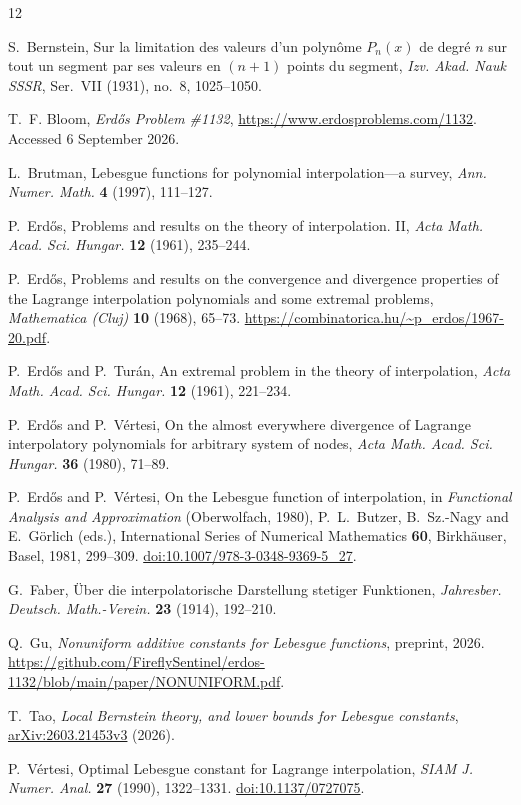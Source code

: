 \documentclass[11pt]{article}
\theoremstyle{remark}
\numberwithin{equation}{section}
\begin{document}
\begin{thebibliography}{12}

S.~Bernstein,
Sur la limitation des valeurs d'un polyn\^ome \(P_n(x)\) de degr\'e \(n\)
sur tout un segment par ses valeurs en \((n+1)\) points du segment,
\emph{Izv. Akad. Nauk SSSR}, Ser.~VII (1931), no.~8, 1025--1050.

T.~F. Bloom,
\emph{Erd\H{o}s Problem \#1132},
\url{https://www.erdosproblems.com/1132}.
Accessed 6 September 2026.

L.~Brutman,
Lebesgue functions for polynomial interpolation---a survey,
\emph{Ann. Numer. Math.} \textbf{4} (1997), 111--127.

P.~Erd\H{o}s,
Problems and results on the theory of interpolation. II,
\emph{Acta Math. Acad. Sci. Hungar.} \textbf{12} (1961), 235--244.

P.~Erd\H{o}s,
Problems and results on the convergence and divergence properties of
the Lagrange interpolation polynomials and some extremal problems,
\emph{Mathematica (Cluj)} \textbf{10} (1968), 65--73.
\url{https://combinatorica.hu/~p_erdos/1967-20.pdf}.

P.~Erd\H{o}s and P.~Tur\'an,
An extremal problem in the theory of interpolation,
\emph{Acta Math. Acad. Sci. Hungar.} \textbf{12} (1961), 221--234.

P.~Erd\H{o}s and P.~V\'ertesi,
On the almost everywhere divergence of Lagrange interpolatory polynomials
for arbitrary system of nodes,
\emph{Acta Math. Acad. Sci. Hungar.} \textbf{36} (1980), 71--89.

P.~Erd\H{o}s and P.~V\'ertesi,
On the Lebesgue function of interpolation,
in \emph{Functional Analysis and Approximation} (Oberwolfach, 1980),
P.~L.~Butzer, B.~Sz.-Nagy and E.~G\"orlich (eds.),
International Series of Numerical Mathematics \textbf{60},
Birkh\"auser, Basel, 1981, 299--309.
\href{https://doi.org/10.1007/978-3-0348-9369-5_27}{doi:10.1007/978-3-0348-9369-5\_27}.

G.~Faber,
\"Uber die interpolatorische Darstellung stetiger Funktionen,
\emph{Jahresber. Deutsch. Math.-Verein.} \textbf{23} (1914), 192--210.

Q.~Gu,
\emph{Nonuniform additive constants for Lebesgue functions},
preprint, 2026.
\url{https://github.com/FireflySentinel/erdos-1132/blob/main/paper/NONUNIFORM.pdf}.

T.~Tao,
\emph{Local Bernstein theory, and lower bounds for Lebesgue constants},
\href{https://arxiv.org/abs/2603.21453v3}{arXiv:2603.21453v3}
(2026).

P.~V\'ertesi,
Optimal Lebesgue constant for Lagrange interpolation,
\emph{SIAM J. Numer. Anal.} \textbf{27} (1990), 1322--1331.
\href{https://doi.org/10.1137/0727075}{doi:10.1137/0727075}.

\end{thebibliography}
\end{document}
